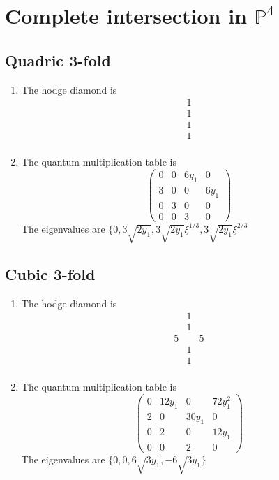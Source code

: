 \documentclass[11pt]{amsart}
\newcounter{num}[section] %
\begin{document}
\section{Complete intersection in $\mathbb{P}^4$}

\subsection{Quadric 3-fold}

\begin{enumerate}
   
\item[1)] The hodge diamond is
\[
    \begin{array}{ccc}
         &1&  \\
          &1&  \\
           &1&  \\
            &1&  \\
    \end{array}
\]
\item[2)] The quantum multiplication table is
\[
    \begin{pmatrix}
        0& 0 &6y_1 &0\\
        3&0 &0 &6y_1\\
        0& 3 &0&0\\
        0&0&3&0
    \end{pmatrix}
\]
The eigenvalues are $\{0,3\sqrt{2y_1},3\sqrt{2y_1}\xi^{1/3},3\sqrt{2y_1}\xi^{2/3}$
\end{enumerate}


\subsection{Cubic 3-fold}
\begin{enumerate}
   

\item[1)] The hodge diamond is
\[
    \begin{array}{ccc}
         &1&  \\
          &1&  \\
          5&&5\\
           &1&  \\
            &1&  \\
    \end{array}
\]
\item[2)] The quantum multiplication table is
\[
    \begin{pmatrix}
        0& 12y_1 &0 &72y_{1}^{2}\\
        2&0 &30y_1 &0\\
        0& 2 &0&12y_1\\
        0&0&2&0
    \end{pmatrix}
\]
The eigenvalues are $\{0,0,6\sqrt{3y_1},-6\sqrt{3y_1}\}$
\end{enumerate}
\end{document}
